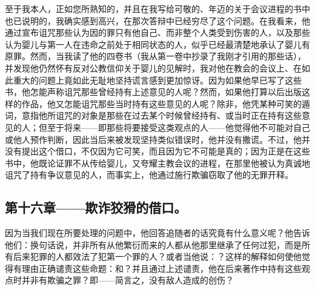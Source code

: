 至于我本人，正如您所熟知的，并且在我写给可敬的、年迈的关于会议进程的书中也已说明的，我确实感到高兴，在那次答辩中已经穷尽了这个问题。在我看来，他通过宣布诅咒那些认为因的罪只有他自己、而非整个人类受到伤害的人，以及那些认为婴儿与第一人在违命之前处于相同状态的人，似乎已经最清楚地承认了婴儿有原罪。然而，当我读了他的四卷书（我从第一卷中抄录了我刚才引用的那些话），并发现他仍然怀有反对公教信仰关于婴儿的见解时，我对他在教会的会议上、在如此重大的问题上竟如此无耻地坚持谎言感到更加惊讶。因为如果他早已写了这些书，他怎能声称诅咒那些曾经持有上述意见的人呢？然而，如果他打算以后出版这样的作品，他又怎能诅咒那些当时持有这些意见的人呢？除非，他凭某种可笑的遁词，意指他所诅咒的对象是那些在过去某个时候曾经持有、或当时正在持有这些意见的人；但至于将来——即那些将要接受这类观点的人——他觉得他不可能对自己或他人预作判断，因此当后来被发现坚持类似错误时，他并没有撒谎。不过，他并没有提出这个借口，不仅因为它可笑，而且因为它不可能是真的；因为正是在这些书中，他既论证罪不从传给婴儿，又夸耀主教会议的进程，在那里他被认为真诚地诅咒了持有争议意见的人，而事实上，他通过施行欺骗窃取了他的无罪开释。\par


\subsection{第十六章——欺诈狡猾的借口。}

因为当我们现在所要处理的问题中，他回答追随者的话究竟有什么意义呢？他告诉他们：换句话说，并非所有从他繁衍而来的人都从他那里继承了任何过犯，而是所有后来犯罪的人都效法了犯第一个罪的人？或者当他说：？这样的解释如何使他觉得有理由正确谴责这些命题：和？并且通过上述谴责，他在后来著作中持有这些观点时并非有欺骗之罪？即——简言之，没有敌人造成的创伤？\par


